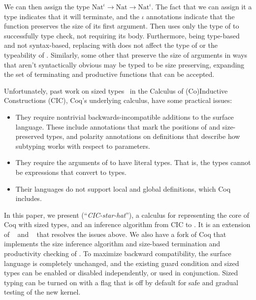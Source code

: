 We can then assign  the type $\text{Nat}^\iota \to \text{Nat} \to \text{Nat}^\iota$.
The fact that we can assign it a type indicates that it will terminate, and the $\iota$ annotations indicate that the function preserves the size of its first argument.
Then  uses only the type of  to successfully type check, not requiring its body.
Furthermore, being type-based and not syntax-based, replacing  with  does not affect the type of  or the typeability of . Similarly, some other \cofixpoints that preserve the size of arguments in ways that aren't syntactically obvious may be typed to be size preserving, expanding the set of terminating and productive functions that can be accepted.

Unfortunately, past work on sized types~\citep{cic-hat, cic-hat-minus} in the Calculus of (Co)\-Inductive Constructions (CIC), Coq's underlying calculus, have some practical issues:

\begin{itemize}
    \item They require nontrivial backwards-incompatible additions to the surface language.
      These include annotations that mark the positions of \corecursive and size-preserved types, and polarity annotations on \coinductive definitions that describe how subtyping works with respect to parameters.
    \item They require the \corecursive arguments of \cofixpoints to have literal \coinductive types.
      That is, the types cannot be expressions that convert to \coinductive types.
    \item Their languages do not support local and global definitions, which Coq includes.
\end{itemize}

In this paper, we present \lang (``\emph{CIC-star-hat}''), a calculus for representing the core of Coq with sized types, and an inference algorithm from CIC to \lang.
It is an extension of \CIChat~\citep{cic-hat} and \CIChatminus~\citep{cic-hat-minus} that resolves the issues above.
We also have a fork of Coq\blindimpl\xspace that implements the size inference algorithm and size-based termination and productivity checking of \lang.
To maximize backward compatibility, the surface language is completely unchanged, and the existing guard condition and sized types can be enabled or disabled independently, or used in conjunction.
Sized typing can be turned on with a flag that is off by default for safe and gradual testing of the new kernel.

